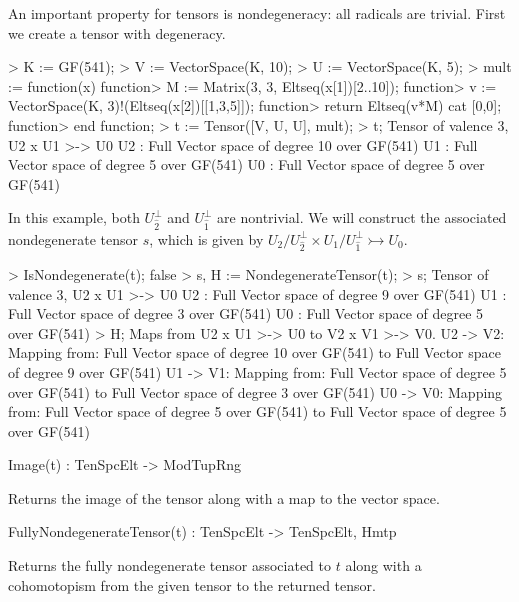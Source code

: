 \begin{example}[Nondegeneracy]

An important property for tensors is nondegeneracy: all radicals are trivial.
First we create a tensor with degeneracy.
\begin{code}
> K := GF(541);
> V := VectorSpace(K, 10);
> U := VectorSpace(K, 5);
> mult := function(x)
function>   M := Matrix(3, 3, Eltseq(x[1])[2..10]);
function>   v := VectorSpace(K, 3)!(Eltseq(x[2])[[1,3,5]]);
function>   return Eltseq(v*M) cat [0,0];
function> end function;
> t := Tensor([V, U, U], mult);
> t;
Tensor of valence 3, U2 x U1 >-> U0
U2 : Full Vector space of degree 10 over GF(541)
U1 : Full Vector space of degree 5 over GF(541)
U0 : Full Vector space of degree 5 over GF(541)
\end{code}

In this example, both $U_{\widehat{2}}^\perp$ and $U_{\widehat{1}}^\perp$ are nontrivial.
We will construct the associated nondegenerate tensor $s$, which is given by $U_2/U_{\widehat{2}}^\perp \times U_1/U_{\widehat{1}}^\perp \rightarrowtail U_0$. 
\begin{code}
> IsNondegenerate(t);
false
> s, H := NondegenerateTensor(t);
> s;
Tensor of valence 3, U2 x U1 >-> U0
U2 : Full Vector space of degree 9 over GF(541)
U1 : Full Vector space of degree 3 over GF(541)
U0 : Full Vector space of degree 5 over GF(541)
> H;
Maps from U2 x U1 >-> U0 to V2 x V1 >-> V0.
U2 -> V2: Mapping from: Full Vector space of degree 10 over GF(541) to 
Full Vector space of degree 9 over GF(541)
U1 -> V1: Mapping from: Full Vector space of degree 5 over GF(541) to 
Full Vector space of degree 3 over GF(541)
U0 -> V0: Mapping from: Full Vector space of degree 5 over GF(541) to 
Full Vector space of degree 5 over GF(541)
\end{code}
\end{example}

\begin{intrinsics}
Image(t) : TenSpcElt -> ModTupRng
\end{intrinsics}

Returns the image of the tensor along with a map to the vector space.

\begin{intrinsics}
FullyNondegenerateTensor(t) : TenSpcElt -> TenSpcElt, Hmtp
\end{intrinsics}

Returns the fully nondegenerate tensor associated to $t$ along with a
cohomotopism from the given tensor to the returned tensor.

